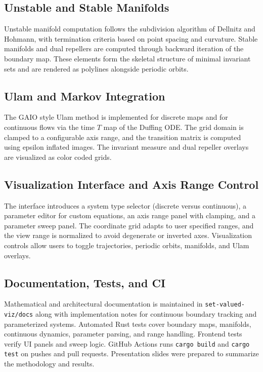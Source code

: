 \documentclass[11pt,twocolumn]{article}
\begin{document}
\subsection{Unstable and Stable Manifolds}
Unstable manifold computation follows the subdivision algorithm of Dellnitz and Hohmann, with termination criteria based on point spacing and curvature. Stable manifolds and dual repellers are computed through backward iteration of the boundary map. These elements form the skeletal structure of minimal invariant sets and are rendered as polylines alongside periodic orbits.

\subsection{Ulam and Markov Integration}
The GAIO style Ulam method is implemented for discrete maps and for continuous flows via the time $T$ map of the Duffing ODE. The grid domain is clamped to a configurable axis range, and the transition matrix is computed using epsilon inflated images. The invariant measure and dual repeller overlays are visualized as color coded grids.

\subsection{Visualization Interface and Axis Range Control}
The interface introduces a system type selector (discrete versus continuous), a parameter editor for custom equations, an axis range panel with clamping, and a parameter sweep panel. The coordinate grid adapts to user specified ranges, and the view range is normalized to avoid degenerate or inverted axes. Visualization controls allow users to toggle trajectories, periodic orbits, manifolds, and Ulam overlays.

\subsection{Documentation, Tests, and CI}
Mathematical and architectural documentation is maintained in \texttt{set-valued-viz/docs} along with implementation notes for continuous boundary tracking and parameterized systems. Automated Rust tests cover boundary maps, manifolds, continuous dynamics, parameter parsing, and range handling. Frontend tests verify UI panels and sweep logic. GitHub Actions runs \texttt{cargo build} and \texttt{cargo test} on pushes and pull requests. Presentation slides were prepared to summarize the methodology and results.
\end{document}
